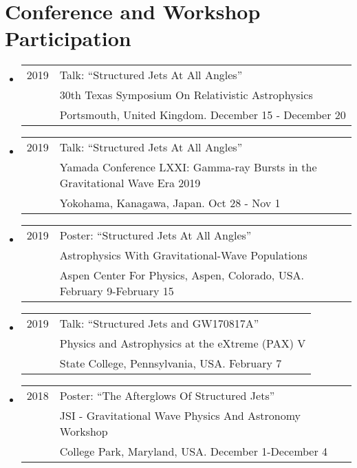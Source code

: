 \section*{Conference and Workshop Participation}
\begin{itemize}

\item \begin{tabular}{ll}
2019 & Talk: ``Structured Jets At All Angles'' \\
	 &  30th Texas Symposium On Relativistic Astrophysics \\
	 &  Portsmouth, United Kingdom. December 15 - December 20
\end{tabular}

\item \begin{tabular}{ll}
2019 & Talk: ``Structured Jets At All Angles'' \\
	 &  Yamada Conference LXXI: Gamma-ray Bursts in the Gravitational Wave Era 2019 \\
	 &  Yokohama, Kanagawa, Japan. Oct 28 - Nov 1
\end{tabular}

\item \begin{tabular}{ll}
2019 & Poster: ``Structured Jets At All Angles'' \\
	 &  Astrophysics With Gravitational-Wave Populations \\
	 &  Aspen Center For Physics, Aspen, Colorado, USA. February 9-February 15
\end{tabular}

\item \begin{tabular}{ll}
2019 & Talk: ``Structured Jets and GW170817A'' \\
	 & Physics and Astrophysics at the eXtreme (PAX) V \\
	 & State College, Pennsylvania, USA. February 7
\end{tabular}

\item \begin{tabular}{ll}
2018 & Poster: ``The Afterglows Of Structured Jets'' \\
	 & JSI - Gravitational Wave Physics And Astronomy Workshop \\
	 & College Park, Maryland, USA. December 1-December 4
\end{tabular}


\end{itemize}
